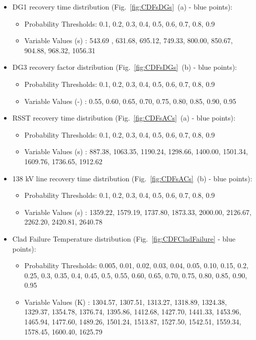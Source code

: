    \begin{itemize}
       \item DG1 recovery time distribution (Fig.~\ref{fig:CDFsDGs}~(a) - blue points): 
       \begin{itemize} 
            \item Probability Thresholds: 0.1, 0.2, 0.3, 0.4, 0.5, 0.6, 0.7, 0.8,  0.9
            \item Variable Values (s)           : 543.69 , 631.68, 695.12, 749.33, 800.00, 850.67, 904.88, 968.32, 1056.31
       \end{itemize}
       \item DG3 recovery factor distribution (Fig.~\ref{fig:CDFsDGs}~(b) - blue points): 
       \begin{itemize} 
            \item Probability Thresholds: 0.1, 0.2, 0.3, 0.4, 0.5, 0.6, 0.7, 0.8,  0.9
            \item Variable Values (-)           : 0.55, 0.60, 0.65, 0.70, 0.75, 0.80, 0.85, 0.90, 0.95
       \end{itemize}
       \item RSST recovery time distribution (Fig.~\ref{fig:CDFsACs}~(a) - blue points): 
       \begin{itemize} 
            \item Probability Thresholds:  0.1, 0.2,  0.3,  0.4, 0.5, 0.6, 0.7,  0.8,  0.9
            \item Variable Values (s)           :  887.38, 1063.35, 1190.24, 1298.66, 1400.00, 1501.34, 1609.76, 1736.65, 1912.62
       \end{itemize}
       \item 138 kV line recovery time distribution (Fig.~\ref{fig:CDFsACs}~(b) - blue points): 
       \begin{itemize} 
            \item Probability Thresholds: 0.1, 0.2, 0.3, 0.4, 0.5, 0.6, 0.7, 0.8, 0.9 
            \item Variable Values (s)           : 1359.22,  1579.19,  1737.80, 1873.33,  2000.00,  2126.67, 2262.20,  2420.81, 2640.78
       \end{itemize}
       \item Clad Failure Temperature distribution (Fig.~\ref{fig:CDFCladFailure} - blue points): 
       \begin{itemize} 
            \item Probability Thresholds: 0.005, 0.01, 0.02, 0.03, 0.04, 0.05, 0.10, 0.15, 0.2, 0.25, 0.3, 0.35, 0.4, 0.45, 0.5, 0.55, 0.60, 0.65, 0.70, 0.75, 0.80, 0.85, 0.90, 0.95
            \item Variable Values (K)           : 1304.57, 1307.51, 1313.27, 1318.89, 1324.38, 1329.37, 1354.78, 1376.74, 1395.86, 1412.68, 1427.70, 1441.33, 1453.96, 1465.94, 1477.60, 1489.26, 1501.24, 1513.87, 1527.50, 	1542.51, 1559.34, 1578.45, 1600.40, 1625.79
    \end{itemize}
\end{itemize}
\vspace{-5mm}

